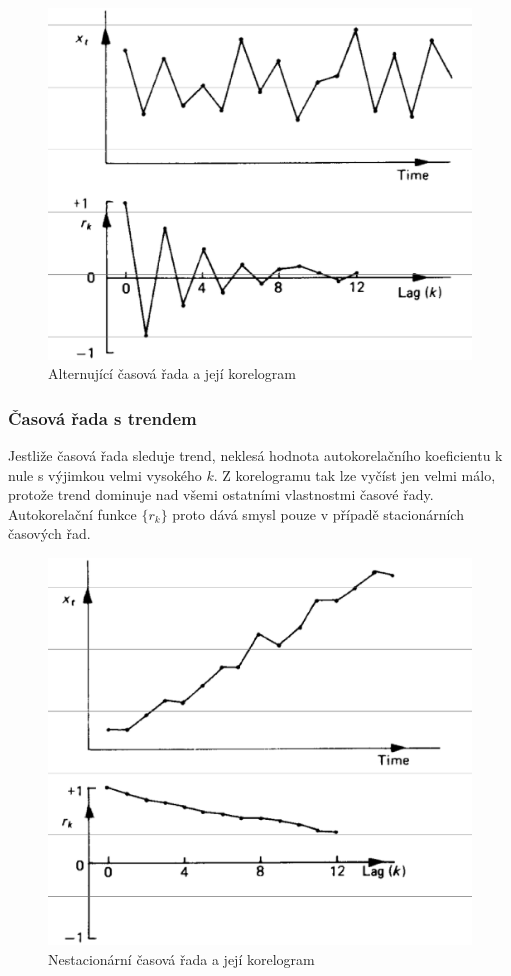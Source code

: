 \begin{figure}[htp]
\centering
\includegraphics[scale = 0.40]{pictures/figure_2_2.eps}
\caption{Alternující časová řada a její korelogram}
\label{figure_2_2}
\end{figure}

\subsubsection{Časová řada s trendem}

Jestliže časová řada sleduje trend, neklesá hodnota autokorelačního koeficientu k nule s výjimkou velmi vysokého $k$. Z korelogramu tak lze vyčíst jen velmi málo, protože trend dominuje nad všemi ostatními vlastnostmi časové řady. Autokorelační funkce $\{r_k\}$ proto dává smysl pouze v případě stacionárních časových řad.

\begin{figure}[htp]
\centering
\includegraphics[scale = 0.40]{pictures/figure_2_3.eps}
\caption{Nestacionární časová řada a její korelogram}
\label{figure_2_3}
\end{figure}

